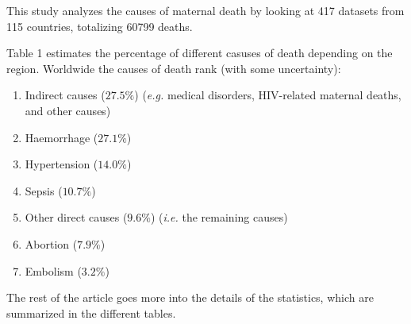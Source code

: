 \documentclass[a4paper,12pt]{article}
\begin{document}
This study analyzes the causes of maternal death by looking at 417 datasets from 115 countries, totalizing 60799 deaths.

Table 1 estimates the percentage of different casuses of death depending on the region. Worldwide the causes of death rank (with some uncertainty):
\begin{enumerate}
\item Indirect causes ($27.5\%$) (\textit{e.g.} medical disorders, HIV-related maternal deaths, and other causes)
\item Haemorrhage ($27.1\%$)
\item Hypertension ($14.0\%$)
\item Sepsis ($10.7\%$)
\item Other direct causes ($9.6\%$) (\textit{i.e.} the remaining causes)
\item Abortion ($7.9\%$)
\item Embolism ($3.2\%$)
\end{enumerate} 

The rest of the article goes more into the details of the statistics, which are summarized in the different tables.

  
\end{document}

